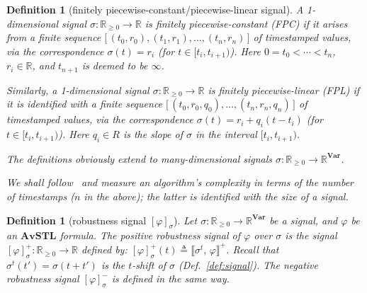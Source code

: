 \documentclass[envcountsect,orivec]{llncs} \usepackage{etex} \usepackage[]{graphicx}
\newtheorem{mydefinition}[mytheorem]{Definition}
\newcommand{\R}{{\mathbb{R}}}
\newcommand{\Var}{\mathbf{Var}}
\newcommand{\Robust}[2]{{ \llbracket #1,\, #2 \rrbracket}}
\newcommand{\Defeq}{\triangleq}
\newcommand{\AvSTL}{\textbf{AvSTL}}
\newcommand{\Rnn}{\R_{\ge 0}}
\begin{document}
\begin{mydefinition}[finitely piecewise-constant/piecewise-linear signal]
  A 1-dimensional signal $\sigma\colon \Rnn \to \R$ is 
  \emph{finitely piecewise-constant (FPC)}
  if it arises from a finite sequence 
  \begin{math}
    \bigl[\,   (t_{0},r_{0}),
      (t_{1},r_{1}),
      \dotsc,
      (t_{n},r_{n})
      \,\bigr]
  \end{math}
  of timestamped values, 
  via the correspondence
\begin{math}
    \sigma(t) = r_{i} 
\end{math}
  (for $t\in[t_{i}, t_{i+1})$).
    Here
    $0=t_{0}<\cdots<t_{n}$,
    $r_{i}\in\R$, and $t_{n+1}$ is deemed to be $\infty$.

    Similarly, a 1-dimensional signal 
    $\sigma\colon \Rnn \to \R$ is \emph{finitely piecewise-linear (FPL)}
    if it is identified with a finite sequence 
    \begin{math}
      \bigl[\,   (t_{0},r_{0}, q_{0}),
        \dotsc,
        (t_{n},r_{n},q_{n})
        \,\bigr]
    \end{math}
    of timestamped values, 
    via the correspondence
\begin{math}
      \sigma(t)= r_{i} + q_{i}(t-t_{i}) 
\end{math}
    (for $t\in[t_{i}, t_{i+1})$). Here $q_{i}\in R$ is the slope of $\sigma$
      in the interval $[t_{i}, t_{i+1})$.

 The definitions obviously extend to many-dimensional signals
$\sigma \colon \Rnn \to
 \R^\Var$.


We shall follow~\cite{DBLP:conf/formats/DonzeM10,DBLP:conf/cav/DonzeFM13} and  measure an algorithm's complexity in terms of
the number of timestamps ($n$ in the above); the latter is identified 
with the \emph{size} of a signal.
\end{mydefinition}








\begin{mydefinition}[robustness signal {$[\varphi]_{\sigma}$}]
  Let $\sigma : \Rnn \to \R^{\Var}$ be a signal, and $\varphi$ be an
 $\AvSTL$ formula.
 The \emph{positive robustness signal} of $\varphi$ over $\sigma$
is the signal 
 $[\varphi]_{\sigma}^{+}\colon \Rnn\to\R$ defined by:
 $[\varphi]_{\sigma}^{+}(t)\Defeq\Robust{\sigma^{t}}{\varphi}^{+}$.
 Recall that $\sigma^{t}(t')=\sigma(t+t')$ is the $t$-shift of $\sigma$
 (Def.~\ref{def:signal}). The \emph{negative robustness signal}
 $[\varphi]_{\sigma}^{-}$ is defined in the same way.
\end{mydefinition}
\end{document}
